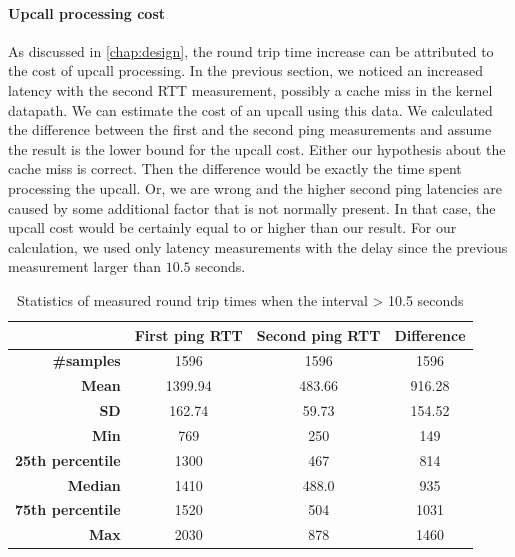 \paragraph{Upcall processing cost}
As discussed in \cref{chap:design}, the round trip time increase can be attributed to the cost of upcall processing. In the previous section, we noticed an increased latency with the second RTT measurement, possibly a cache miss in the kernel datapath.  We can estimate the cost of an upcall using this data. We calculated the difference between the first and the second ping measurements and assume the result is the lower bound for the upcall cost. Either our hypothesis about the cache miss is correct. Then the difference would be exactly the time spent processing the upcall. Or, we are wrong and the higher second ping latencies are caused by some additional factor that is not normally present. In that case, the upcall cost would be certainly equal to or higher than our result. For our calculation, we used only latency measurements with the delay since the previous measurement larger than $10.5$ seconds.

\begin{table}[h!]
    \begin{center}
        \caption{Statistics of measured round trip times when the interval > 10.5 seconds}
        \label{tab:upcall-cost}
        \begin{tabular}{r|S[table-format=4.2]S[table-format=4.2]S[table-format=4.2]}
            & \textbf{First ping RTT} & \textbf{Second ping RTT} & \textbf{Difference} \\
            \hline
            \textbf{\#samples} & 1596 & 1596 & 1596 \\
            \textbf{Mean} & 1399.94 & 483.66 & 916.28 \\
            \textbf{SD} & 162.74 & 59.73 & 154.52\\
            \hline
            \textbf{Min} & 769 & 250 & 149 \\
            \textbf{25th percentile} & 1300 & 467 & 814 \\
            \textbf{Median} & 1410 & 488.0 & 935 \\
            \textbf{75th percentile} & 1520 & 504 & 1031 \\
            \textbf{Max} & 2030 & 878 & 1460 \\
        \end{tabular}
    \end{center}
\end{table}

